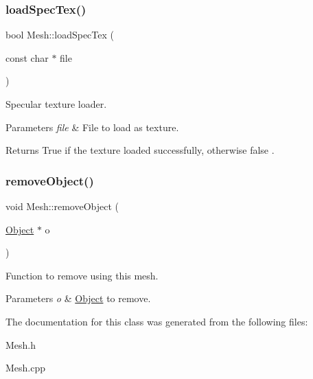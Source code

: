 \subsubsection{\texorpdfstring{load\+Spec\+Tex()}{loadSpecTex()}}
{\footnotesize\ttfamily bool Mesh\+::load\+Spec\+Tex (\begin{DoxyParamCaption}\item[{const char $\ast$}]{file }\end{DoxyParamCaption})}



Specular texture loader. 


\begin{DoxyParams}{Parameters}
{\em file} & File to load as texture. \\
\hline
\end{DoxyParams}
\begin{DoxyReturn}{Returns}
True if the texture loaded successfully, otherwise false . 
\end{DoxyReturn}
\mbox{\label{class_mesh_a7c209ba6e5596edaeb9062cf23d3532b}} 
\subsubsection{\texorpdfstring{remove\+Object()}{removeObject()}}
{\footnotesize\ttfamily void Mesh\+::remove\+Object (\begin{DoxyParamCaption}\item[{\hyperlink{class_object}{Object} $\ast$}]{o }\end{DoxyParamCaption})}



Function to remove using this mesh. 


\begin{DoxyParams}{Parameters}
{\em o} & \hyperlink{class_object}{Object} to remove. \\
\hline
\end{DoxyParams}


The documentation for this class was generated from the following files\+:\begin{DoxyCompactItemize}
\item 
Mesh.\+h\item 
Mesh.\+cpp\end{DoxyCompactItemize}
